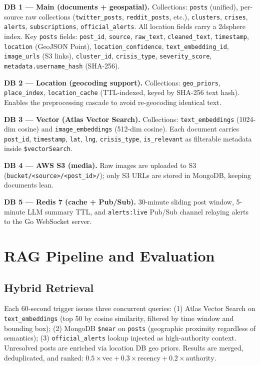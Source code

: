 \documentclass[conference]{IEEEtran}
\begin{document}
\textbf{DB 1 --- Main (documents + geospatial).} Collections: \texttt{posts}
(unified), per-source raw collections (\texttt{twitter\_posts},
\texttt{reddit\_posts}, etc.), \texttt{clusters}, \texttt{crises},
\texttt{alerts}, \texttt{subscriptions}, \texttt{official\_alerts}. All
location fields carry a 2dsphere index. Key \texttt{posts} fields:
\texttt{post\_id}, \texttt{source}, \texttt{raw\_text}, \texttt{cleaned\_text},
\texttt{timestamp}, \texttt{location} (GeoJSON Point),
\texttt{location\_confidence}, \texttt{text\_embedding\_id},
\texttt{image\_urls} (S3 links), \texttt{cluster\_id}, \texttt{crisis\_type},
\texttt{severity\_score}, \texttt{metadata.username\_hash} (SHA-256).

\textbf{DB 2 --- Location (geocoding support).} Collections:
\texttt{geo\_priors}, \texttt{place\_index}, \texttt{location\_cache}
(TTL-indexed, keyed by SHA-256 text hash). Enables the preprocessing cascade
to avoid re-geocoding identical text.

\textbf{DB 3 --- Vector (Atlas Vector Search).} Collections:
\texttt{text\_embeddings} (1024-dim cosine) and \texttt{image\_embeddings}
(512-dim cosine). Each document carries \texttt{post\_id}, \texttt{timestamp},
\texttt{lat}, \texttt{lng}, \texttt{crisis\_type}, \texttt{is\_relevant} as
filterable metadata inside \texttt{\$vectorSearch}.

\textbf{DB 4 --- AWS S3 (media).} Raw images are uploaded to S3
(\texttt{bucket/<source>/<post\_id>/}); only S3 URLs are stored in MongoDB,
keeping documents lean.

\textbf{DB 5 --- Redis 7 (cache + Pub/Sub).} 30-minute sliding post window,
5-minute LLM summary TTL, and \texttt{alerts:live} Pub/Sub channel relaying
alerts to the Go WebSocket server.

\section{RAG Pipeline and Evaluation}

\subsection{Hybrid Retrieval}

Each 60-second trigger issues three concurrent queries: (1) Atlas Vector Search
on \texttt{text\_embeddings} (top 50 by cosine similarity, filtered by time
window and bounding box); (2) MongoDB \texttt{\$near} on \texttt{posts}
(geographic proximity regardless of semantics); (3) \texttt{official\_alerts}
lookup injected as high-authority context. Unresolved posts are enriched via
location DB geo priors. Results are merged, deduplicated, and ranked:
$0.5 \times \text{vec} + 0.3 \times \text{recency} + 0.2 \times \text{authority}$.
\end{document}
